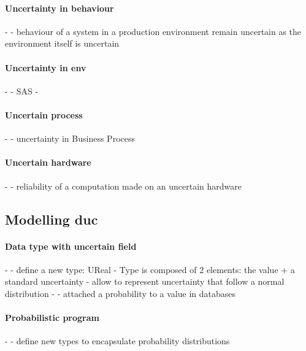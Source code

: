 \paragraph{Uncertainty in \gls{behaviour}}
- \cite{DBLP:journals/sosym/Zhang00NO19}
	- behaviour of a system in a production environment remain uncertain as the environment itself is uncertain
	
\paragraph{Uncertainty in \gls{env}}
- \cite{DBLP:conf/dagstuhl/EsfahaniM10}
	- SAS
- \cite{DBLP:conf/ecmdafa/ZhangSAYON16}
	
\paragraph{Uncertain process}
- \cite{DBLP:journals/infsof/Jimenez-RamirezW0V15}
	- uncertainty in Business Process
	
\paragraph{Uncertain hardware}
- \cite{DBLP:conf/oopsla/CarbinMR13}
	- reliability of a computation made on an uncertain hardware
	
\subsection[Modelling data uncertainty]{Modelling \gls{duc}}

\paragraph{Data type with uncertain field}
- \cite{DBLP:conf/models/BurguenoBMV18, DBLP:conf/ecmdafa/BertoaMBBTV18, DBLP:conf/sle/MayerhoferWV16, DBLP:conf/quatic/VallecilloMO16}
	- define a new type: UReal
	- Type is composed of 2 elements: the value + a standard uncertainty
	- allow to represent uncertainty that follow a normal distribution
- \cite{DBLP:journals/tkde/BarbaraGP92}
	- attached a probability to a value in databases

	
\paragraph{Probabilistic program}
- \cite{baudin2017openturns, DBLP:conf/asplos/BornholtMM14, DBLP:journals/corr/BorgstromGGMG13, osti_1430202, DBLP:journals/peerj-cs/SalvatierWF16, DBLP:conf/popl/BhatAVG12}
	- define new types to encapsulate probability distributions

